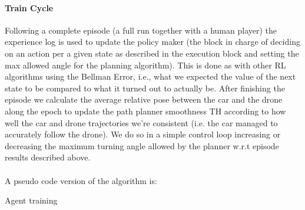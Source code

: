 \documentclass[a4paper,11pt]{article}
\begin{document}
\paragraph{Train Cycle} Following a complete episode (a full run together with a human player) the experience log is used to update the policy maker (the block in charge of deciding on an action per a given state as described in the execution block and setting the max allowed angle for the planning algorithm). This is done as with other RL algorithms using the Bellman Error, i.e., what we expected the value of the next state to be compared to what it turned out to actually be.
After finishing the episode we calculate the average relative pose between the car and the drone along the epoch to update the path planner smoothness TH according to how well the car and drone trajectories we're consistent (i.e. the car managed to accurately follow the drone). We do so in a simple control loop increasing or decreasing the maximum turning angle allowed by the planner w.r.t episode results described above.\\
\\A pseudo code version of the algorithm is:\\


\begin{algorithm}[H]
\SetAlgoLined
\DontPrintSemicolon %
\vspace{1.5mm}
\; \label{algl2:l4}
\caption{Agent training}
\label{algo:training}
\end{algorithm}


\newpage
\end{document}
